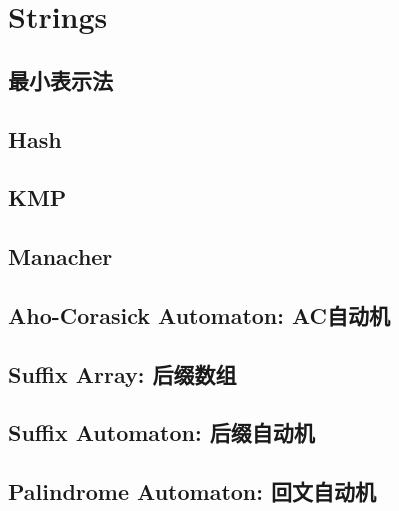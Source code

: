 \documentclass[../template.tex]{subfiles}
\begin{document}
\section{Strings}

\subsection{最小表示法}

\subsection{Hash}

\subsection{KMP}

\subsection{Manacher}

\subsection{Aho-Corasick Automaton: AC自动机}

\subsection{Suffix Array: 后缀数组}

\subsection{Suffix Automaton: 后缀自动机}


\subsection{Palindrome Automaton: 回文自动机}
\end{document}
